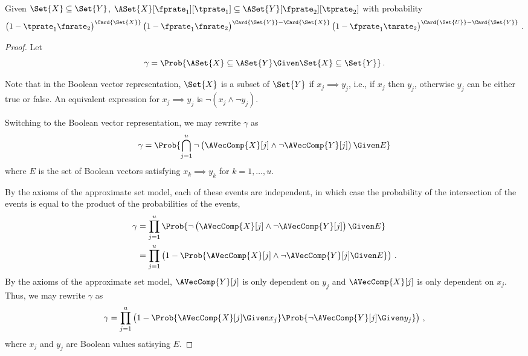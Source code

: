 \documentclass[ ../main.tex]{subfiles}
\begin{document}
\begin{theorem}
Given $\Set{X} \subseteq \Set{Y}$, $\ASet{X}[\fprate_1][\tprate_1] \subseteq \ASet{Y}[\fprate_2][\tprate_2]$ with probability
\begin{equation}
	\left(1 - \tprate_1\fnrate_2\right)^{\Card{\Set{X}}}
	\left(1 - \fprate_1\fnrate_2\right)^{\Card{\Set{Y}} - \Card{\Set{X}}}
	\left(1 - \fprate_1\tnrate_2\right)^{\Card{\Set{U}} - \Card{\Set{Y}}}\,.
\end{equation}
\end{theorem}
\begin{proof}
	Let
	\begin{equation}
	\gamma = \Prob{\ASet{X} \subseteq \ASet{Y} \Given \Set{X} \subseteq 
		\Set{Y}}\,.
	\end{equation}
	
	Note that in the Boolean vector representation, $\Set{X}$ is a subset of 
	$\Set{Y}$ if $x_j \implies y_j$, i.e., if $x_j$ then $y_j$, otherwise $y_j$ can 
	be either true or false. An equivalent expression for $x_j \implies y_j$ is 
	$\neg (x_j \land \neg y_j)$.
	
	Switching to the Boolean vector representation, we may rewrite $\gamma$ as
	\begin{equation}
	\gamma = \Prob{\bigcap_{j=1}^{u} \neg \left(\AVecComp{X}[j] \land \neg 
		\AVecComp{Y}[j]\right) \Given E}
	\end{equation}
	where $E$ is the set of Boolean vectors satisfying $x_k \implies y_k$ for     
	$k=1,\ldots,u$.
	
	By the axioms of the approximate set model, each of these events are 
	independent, in which case the probability of the intersection of the events is 
	equal to the product of the probabilities of the events,
	\begin{align}
	\gamma
	&= \prod_{j=1}^{u} \Prob{\neg\left(\AVecComp{X}[j] 
		\land \neg \AVecComp{Y}[j]\right) \Given E}\\
	&= \prod_{j=1}^{u} \left(1 - \Prob{\AVecComp{X}[j] 
		\land \neg \AVecComp{Y}[j] \Given E}\right)\,.
	\end{align}
	By the axioms of the approximate set model, $\AVecComp{Y}[j]$ is only dependent 
	on $y_j$ and $\AVecComp{X}[j]$ is only dependent on $x_j$. Thus, we may rewrite 
	$\gamma$ as
	\begin{equation}
	\gamma = \prod_{j=1}^{u}\left(
	1 - \Prob{\AVecComp{X}[j] \Given x_j}
	\Prob{\neg \AVecComp{Y}[j] \Given y_j}\right)\,,
	\end{equation}
	where $x_j$ and $y_j$ are Boolean values satisying $E$.
	

\end{proof}
\end{document}
